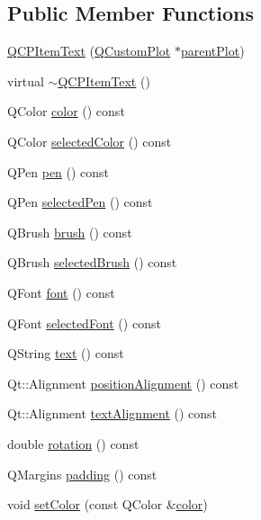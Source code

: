 \subsection*{Public Member Functions}
\begin{DoxyCompactItemize}
\item 
\hyperlink{classQCPItemText_a77ff96a2972a00872ff8f8c67143abbe}{Q\+C\+P\+Item\+Text} (\hyperlink{classQCustomPlot}{Q\+Custom\+Plot} $\ast$\hyperlink{classQCPLayerable_ab7e0e94461566093d36ffc0f5312b109}{parent\+Plot})
\item 
virtual \hyperlink{classQCPItemText_a1efd41ca53d49042d4f4b63cf9615cb6}{$\sim$\+Q\+C\+P\+Item\+Text} ()
\item 
Q\+Color \hyperlink{classQCPItemText_ac9cb0a8a27f64d1b40855910ea9ebd03}{color} () const 
\item 
Q\+Color \hyperlink{classQCPItemText_a44f690ec0ba6a32e518f2e923c002e39}{selected\+Color} () const 
\item 
Q\+Pen \hyperlink{classQCPItemText_a552bd02f46dbcb4b4812559036893352}{pen} () const 
\item 
Q\+Pen \hyperlink{classQCPItemText_a70c86ec95133d3e904d1718023fe3c4e}{selected\+Pen} () const 
\item 
Q\+Brush \hyperlink{classQCPItemText_a38b981dfacb703efa8e27346eebcb5a2}{brush} () const 
\item 
Q\+Brush \hyperlink{classQCPItemText_ac6802bbceff1ade0053166c64a5a6966}{selected\+Brush} () const 
\item 
Q\+Font \hyperlink{classQCPItemText_ad34943fd68a9b1451d3e3234d072e418}{font} () const 
\item 
Q\+Font \hyperlink{classQCPItemText_af2e7cacb1975132508714a51c5f48c3b}{selected\+Font} () const 
\item 
Q\+String \hyperlink{classQCPItemText_a9547f7832010486abed0837e75db5330}{text} () const 
\item 
Qt\+::\+Alignment \hyperlink{classQCPItemText_af13c6adc480f268116ae72196eb44b06}{position\+Alignment} () const 
\item 
Qt\+::\+Alignment \hyperlink{classQCPItemText_aaa1d84b3f61f9f2a0cce230e66ef7194}{text\+Alignment} () const 
\item 
double \hyperlink{classQCPItemText_ae8991207fa1697511c1c8af9f3ca0e0a}{rotation} () const 
\item 
Q\+Margins \hyperlink{classQCPItemText_a00e0fa03822ff384bf4921c1c90322ff}{padding} () const 
\item 
void \hyperlink{classQCPItemText_aa51efc0841fe52da9eaf8aff6fc8a8b2}{set\+Color} (const Q\+Color \&\hyperlink{classQCPItemText_ac9cb0a8a27f64d1b40855910ea9ebd03}{color})

\end{DoxyCompactItemize}
